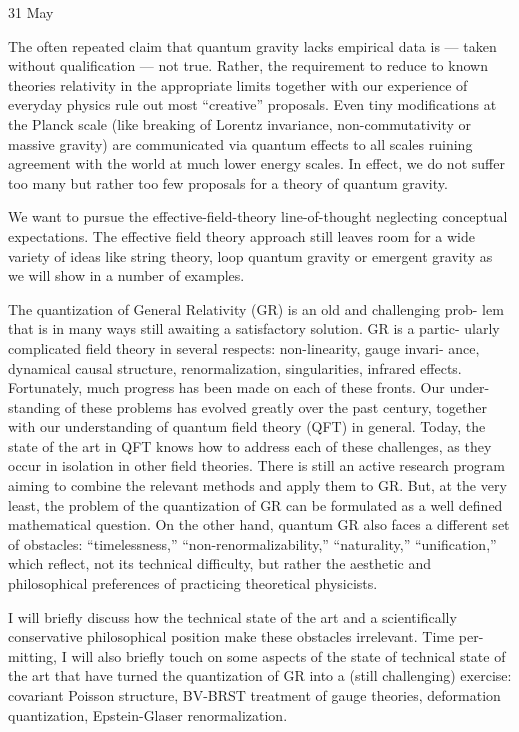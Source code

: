 \documentclass{conference}
\begin{document}
\begin{Day}{31 May}
{The often repeated claim that quantum gravity lacks empirical data is --- taken without qualification --- not true. Rather, the requirement to reduce to known theories relativity in the appropriate limits together with our experience of everyday physics rule out most “creative” proposals.  Even tiny modifications at the Planck scale (like breaking of Lorentz invariance, non-commutativity or massive gravity) are communicated via quantum effects to all scales ruining agreement with the world at much lower energy scales. In effect, we do not suffer too many but rather too few proposals for a theory of quantum gravity.

We want to pursue the effective-field-theory line-of-thought neglecting conceptual expectations. The effective field theory approach still leaves room for a wide variety of ideas like string theory, loop quantum gravity or emergent gravity as we will show in a number of examples.}



    {The quantization of General Relativity (GR) is an old and challenging prob- lem that is in many ways still awaiting a satisfactory solution. GR is a partic- ularly complicated field theory in several respects: non-linearity, gauge invari- ance, dynamical causal structure, renormalization, singularities, infrared effects. Fortunately, much progress has been made on each of these fronts. Our under- standing of these problems has evolved greatly over the past century, together with our understanding of quantum field theory (QFT) in general. Today, the state of the art in QFT knows how to address each of these challenges, as they occur in isolation in other field theories. There is still an active research program aiming to combine the relevant methods and apply them to GR. But, at the very least, the problem of the quantization of GR can be formulated as a well defined mathematical question. On the other hand, quantum GR also faces a different set of obstacles: “timelessness,” “non-renormalizability,” “naturality,” “unification,” which reflect, not its technical difficulty, but rather the aesthetic and philosophical preferences of practicing theoretical physicists.

I will briefly discuss how the technical state of the art and a scientifically conservative philosophical position make these obstacles irrelevant. Time per- mitting, I will also briefly touch on some aspects of the state of technical state of the art that have turned the quantization of GR into a (still challenging) exercise: covariant Poisson structure, BV-BRST treatment of gauge theories, deformation quantization, Epstein-Glaser renormalization.}


\end{Day}
\end{document}
